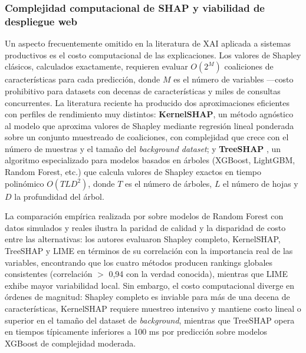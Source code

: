 \documentclass[12pt, letterpaper]{article}
\begin{document}
\subsubsection{Complejidad computacional de SHAP y viabilidad de despliegue web}
\label{sec:xai-complejidad}

Un aspecto frecuentemente omitido en la literatura de XAI aplicada a sistemas productivos es el costo computacional de las explicaciones. Los valores de Shapley cl\'asicos, calculados exactamente, requieren evaluar $O(2^M)$ coaliciones de caracter\'isticas para cada predicci\'on, donde $M$ es el n\'umero de variables ---costo prohibitivo para datasets con decenas de caracter\'isticas y miles de consultas concurrentes. La literatura reciente ha producido dos aproximaciones eficientes con perfiles de rendimiento muy distintos: \textbf{KernelSHAP}, un m\'etodo agn\'ostico al modelo que aproxima valores de Shapley mediante regresi\'on lineal ponderada sobre un conjunto muestreado de coaliciones, con complejidad que crece con el n\'umero de muestras y el tama\~no del \textit{background dataset}; y \textbf{TreeSHAP} \citep{LundbergTreeSHAP2020}, un algoritmo especializado para modelos basados en \'arboles (XGBoost, LightGBM, Random Forest, etc.) que calcula valores de Shapley exactos en tiempo polin\'omico $O(TLD^2)$, donde $T$ es el n\'umero de \'arboles, $L$ el n\'umero de hojas y $D$ la profundidad del \'arbol.

La comparaci\'on emp\'irica realizada por \citet{Deng2024} sobre modelos de Random Forest con datos simulados y reales ilustra la paridad de calidad y la disparidad de costo entre las alternativas: los autores evaluaron Shapley completo, KernelSHAP, TreeSHAP y LIME en t\'erminos de su correlaci\'on con la importancia real de las variables, encontrando que los cuatro m\'etodos producen rankings globales consistentes (correlaci\'on $>$ 0,94 con la verdad conocida), mientras que LIME exhibe mayor variabilidad local. Sin embargo, el costo computacional diverge en \'ordenes de magnitud: Shapley completo es inviable para m\'as de una decena de caracter\'isticas, KernelSHAP requiere muestreo intensivo y mantiene costo lineal o superior en el tama\~no del dataset de \textit{background}, mientras que TreeSHAP opera en tiempos t\'ipicamente inferiores a 100 ms por predicci\'on sobre modelos XGBoost de complejidad moderada.
\end{document}
